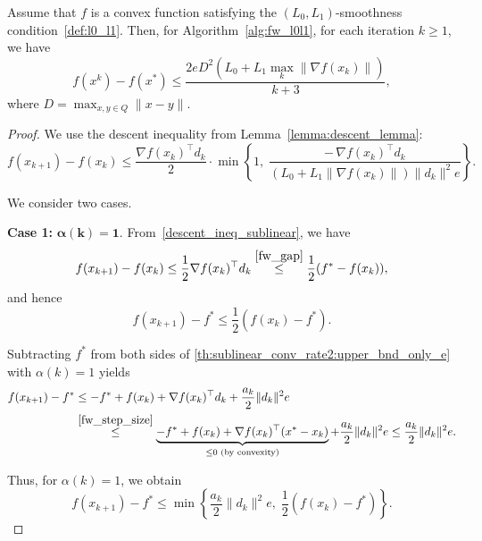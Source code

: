 \documentclass[runningheads]{llncs}
\begin{document}
	\begin{theorem}\label{th:sublinear_conv_rate2}
		Assume that $f$ is a convex function satisfying the $(L_0,L_1)$-smoothness condition~\ref{def:l0_l1}. Then, for Algorithm~\ref{alg:fw_l0l1}, for each iteration $k \geq 1$, we have
		\begin{equation*}
			f(x^k) - f(x^*) \leq \frac{2eD^2 \left( L_0 + L_1 \max_k \| \nabla f(x_k) \| \right)}{k + 3},
		\end{equation*}
		where $D = \max_{x,y \in Q} \|x - y\|$.
	\end{theorem}
	
	\begin{proof}
		We use the descent inequality from Lemma~\ref{lemma:descent_lemma}:
		\begin{equation}\label{descent_ineq_sublinear}
			f(x_{k+1}) - f(x_k)
			\leq
			\frac{\nabla f(x_k)^\top d_k}{2}
			\cdot
			\min \left\{
			1,\;
			\frac{-\, \nabla f(x_k)^\top d_k}{
				\left(L_0 + L_1 \|\nabla f(x_k)\|\right)
				\|d_k\|^2 e}
			\right\}.
		\end{equation}
		
		We consider two cases.
		
		\medskip
		\noindent
		\textbf{Case 1:} $\boldsymbol{\alpha(k) = 1.}$  
		From~\eqref{descent_ineq_sublinear}, we have
		\begin{equation*}
			f(x_{k+1}) - f(x_k)
			\leq
			\frac{1}{2} \nabla f(x_k)^\top d_k
			\overset{\eqref{fw_gap}}{\leq}
			\frac{1}{2} (f^* - f(x_k)),
		\end{equation*}
		and hence
		\begin{equation*}
			f(x_{k+1}) - f^* \leq \frac{1}{2} (f(x_k) - f^*).
		\end{equation*}
		
		Subtracting $f^*$ from both sides of
		\eqref{th:sublinear_conv_rate2:upper_bnd_only_e} with $\alpha(k)=1$ yields
		\begin{equation*}
			\begin{split}
				f(x_{k+1}) - f^*
				&\leq -f^* + f(x_k) + \nabla f(x_k)^\top d_k
				+ \frac{a_k}{2} \|d_k\|^2 e \\
				&\overset{\eqref{fw_step_size}}{\leq}
				\underbrace{-f^* + f(x_k)
					+ \nabla f(x_k)^\top (x^* - x_k)}_{\leq 0 \text{ (by convexity)}}
				+ \frac{a_k}{2} \|d_k\|^2 e
				\leq \frac{a_k}{2} \|d_k\|^2 e.
			\end{split}
		\end{equation*}
		
		Thus, for $\alpha(k) = 1$, we obtain
		\begin{equation}\label{alpha_1_case_desc_ineq}
			f(x_{k+1}) - f^* \leq
			\min \left\{
			\frac{a_k}{2} \|d_k\|^2 e,\;
			\frac{1}{2}(f(x_k) - f^*)
			\right\}.
		\end{equation}
		

\end{proof}
\end{document}
